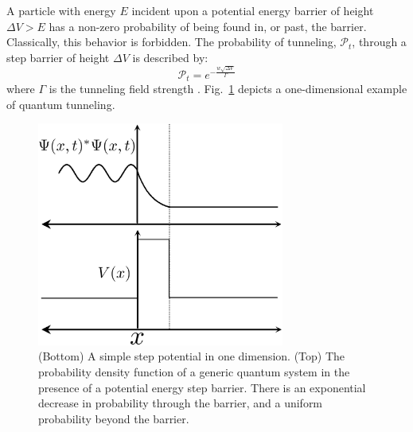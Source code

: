 \documentclass[11pt]{afthesis}
\begin{document}
	A particle with energy \begin{math} E \end{math} incident upon a potential energy barrier of height \begin{math} \Delta V > E  \end{math} has a non-zero probability of being found in, or past, the barrier. Classically, this behavior is forbidden. The probability of tunneling, \begin{math} \mathcal{P}_t \end{math}, through a step barrier of height \begin{math} \Delta V  \end{math} is described by: 
	\begin{equation}
	\mathcal{P}_t = e^{-\frac{w \sqrt{\Delta V}}{ \Gamma}} 
	\label{eq:quantum_tunneling_prob}
	\end{equation} where \begin{math} \Gamma \end{math} is the tunneling field strength \cite{mukherjee2015multivariatesearchqa}. Fig.~\ref{fig:quantum_tunneling} depicts a one-dimensional example of quantum tunneling.
	
	\begin{figure}[ht!]
		
		\begin{center}
			\includegraphics[width = 3.2in]{figures/tunneling_ex.eps}
		\end{center}
		\caption{(Bottom) A simple step potential in one dimension. (Top) The probability density function of a generic quantum system in the presence of a potential energy step barrier. There is an exponential decrease in probability through the barrier, and a uniform probability beyond the barrier.}
		
		\label{fig:quantum_tunneling}
	\end{figure}
	
\end{document}
